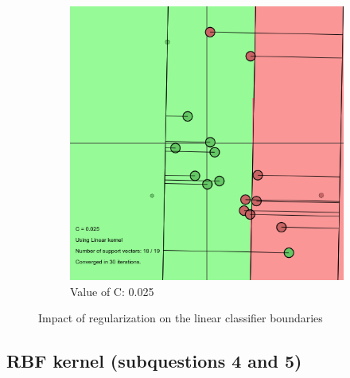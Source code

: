 \documentclass[11pt, a4paper]{article}
\begin{document}
\begin{figure}[H]
\begin{subfigure}{.5\textwidth}
      \includegraphics[width=0.9\linewidth]{1-2-1-linear_c_min.png}
      \caption{Value of C: 0.025}
      \label{fig:lin4}
    \end{subfigure}
    \caption{Impact of regularization on the linear classifier boundaries}
    \label{fig:bull}
\end{figure}

\subsection{RBF kernel (subquestions 4 and 5)}
\end{document}

